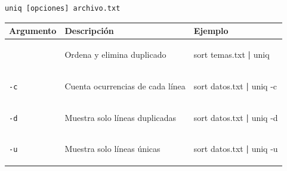 \documentclass[
  spanish,
  12pt,
  letterpaper,
  DIV=11,
  numbers=noendperiod]{scrreprt}
\newenvironment{Shaded}{\begin{snugshade}}{\end{snugshade}}
\newcommand{\AttributeTok}[1]{\textcolor[rgb]{0.40,0.45,0.13}{#1}}
\newcommand{\FunctionTok}[1]{\textcolor[rgb]{0.28,0.35,0.67}{#1}}
\newcommand{\KeywordTok}[1]{\textcolor[rgb]{0.00,0.23,0.31}{\textbf{#1}}}
\newcommand{\NormalTok}[1]{\textcolor[rgb]{0.00,0.23,0.31}{#1}}
\newcounter{none} %
\begin{document}
\begin{verbatim}
uniq [opciones] archivo.txt
\end{verbatim}

{\def\LTcaptype{none} %
\begin{longtable}[]{@{}
  >{\raggedright\arraybackslash}p{}
  >{\raggedright\arraybackslash}p{}
  >{\raggedright\arraybackslash}p{}@{}}
\toprule\noalign{}
\begin{minipage}[b]{\linewidth}\raggedright
Argumento
\end{minipage} & \begin{minipage}[b]{\linewidth}\raggedright
Descripción
\end{minipage} & \begin{minipage}[b]{\linewidth}\raggedright
Ejemplo
\end{minipage} \\
\midrule\noalign{}
\endhead
\bottomrule\noalign{}
\endlastfoot
& Ordena y elimina duplicado &
\begin{minipage}[t]{\linewidth}\raggedright
\begin{Shaded}
\begin{Highlighting}[]
\FunctionTok{sort}\NormalTok{ temas.txt }\KeywordTok{|} \FunctionTok{uniq}
\end{Highlighting}
\end{Shaded}
\end{minipage} \\
\texttt{-c} & Cuenta ocurrencias de cada línea &
\begin{minipage}[t]{\linewidth}\raggedright
\begin{Shaded}
\begin{Highlighting}[]
\FunctionTok{sort}\NormalTok{ datos.txt }\KeywordTok{|} \FunctionTok{uniq} \AttributeTok{{-}c}
\end{Highlighting}
\end{Shaded}
\end{minipage} \\
\texttt{-d} & Muestra solo líneas duplicadas &
\begin{minipage}[t]{\linewidth}\raggedright
\begin{Shaded}
\begin{Highlighting}[]
\FunctionTok{sort}\NormalTok{ datos.txt }\KeywordTok{|} \FunctionTok{uniq} \AttributeTok{{-}d}
\end{Highlighting}
\end{Shaded}
\end{minipage} \\
\texttt{-u} & Muestra solo líneas únicas &
\begin{minipage}[t]{\linewidth}\raggedright
\begin{Shaded}
\begin{Highlighting}[]
\FunctionTok{sort}\NormalTok{ datos.txt }\KeywordTok{|} \FunctionTok{uniq} \AttributeTok{{-}u}
\end{Highlighting}
\end{Shaded}
\end{minipage} \\
\end{longtable}
}
\end{document}
